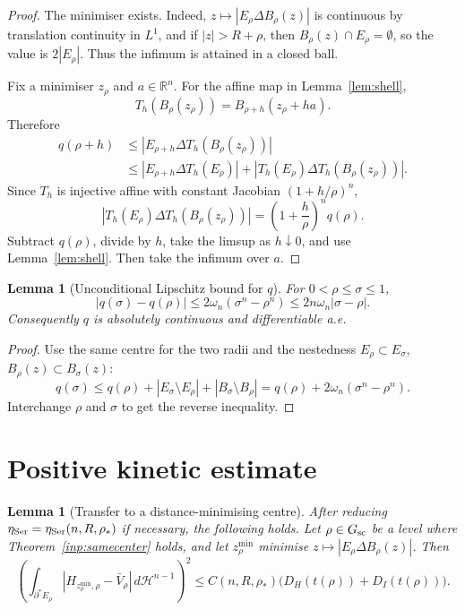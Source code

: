 \documentclass[11pt]{amsart}
\newtheorem{lemma}[theorem]{Lemma}
\theoremstyle{definition}
\newcommand{\R}{\mathbb R}
\newcommand{\rstar}{\rho_*}
\newcommand{\Hn}{\mathcal H^{n-1}}
\begin{document}
\begin{proof}
The minimiser exists.  Indeed, \(z\mapsto |E_\rho\Delta B_\rho(z)|\) is
continuous by translation continuity in \(L^1\), and if
\(|z|>R+\rho\), then \(B_\rho(z)\cap E_\rho=\emptyset\), so the value is
\(2|E_\rho|\).  Thus the infimum is attained in a closed ball.

Fix a minimiser \(z_\rho\) and \(a\in\R^n\).  For the affine map in
Lemma~\ref{lem:shell},
\[
   T_h(B_\rho(z_\rho))=B_{\rho+h}(z_\rho+ha).
\]
Therefore
\[
\begin{aligned}
   q(\rho+h)
   &\le |E_{\rho+h}\Delta T_h(B_\rho(z_\rho))|\\
   &\le |E_{\rho+h}\Delta T_h(E_\rho)|
      +|T_h(E_\rho)\Delta T_h(B_\rho(z_\rho))|.
\end{aligned}
\]
Since \(T_h\) is injective affine with constant Jacobian
\((1+h/\rho)^n\),
\[
   |T_h(E_\rho)\Delta T_h(B_\rho(z_\rho))|
   =
   \left(1+\frac h\rho\right)^n q(\rho).
\]
Subtract \(q(\rho)\), divide by \(h\), take the limsup as \(h\downarrow0\),
and use Lemma~\ref{lem:shell}.  Then take the infimum over \(a\).
\end{proof}

\begin{lemma}[Unconditional Lipschitz bound for \(q\)]\label{lem:qLip}
For \(0<\rho\le\sigma\le1\),
\[
   |q(\sigma)-q(\rho)|
   \le 2\omega_n(\sigma^n-\rho^n)
   \le 2n\omega_n|\sigma-\rho|.
\]
Consequently \(q\) is absolutely continuous and differentiable a.e.
\end{lemma}

\begin{proof}
Use the same centre for the two radii and the nestedness
\(E_\rho\subset E_\sigma\), \(B_\rho(z)\subset B_\sigma(z)\):
\[
   q(\sigma)\le q(\rho)+|E_\sigma\setminus E_\rho|
                         +|B_\sigma\setminus B_\rho|
   =q(\rho)+2\omega_n(\sigma^n-\rho^n).
\]
Interchange \(\rho\) and \(\sigma\) to get the reverse inequality.
\end{proof}

\section{Positive kinetic estimate}\label{sec:kinetic}

\begin{lemma}[Transfer to a distance-minimising centre]
\label{lem:center-transfer}
After reducing \(\eta_{\rm Ser}=\eta_{\rm Ser}(n,R,\rstar)\) if necessary,
the following holds.  Let \(\rho\in G_{\rm sc}\) be a level where
Theorem~\ref{inp:samecenter} holds, and let \(z_\rho^{\min}\) minimise
\(z\mapsto |E_\rho\Delta B_\rho(z)|\).  Then
\begin{equation}\label{eq:H-DI-min}
   \left(
   \int_{\partial^*E_\rho}
      |H_{z_\rho^{\min},\rho}-\bar V_\rho|\,d\Hn
   \right)^2
   \le C(n,R,\rstar)\bigl(D_H(t(\rho))+D_I(t(\rho))\bigr).
\end{equation}
\end{lemma}
\end{document}
